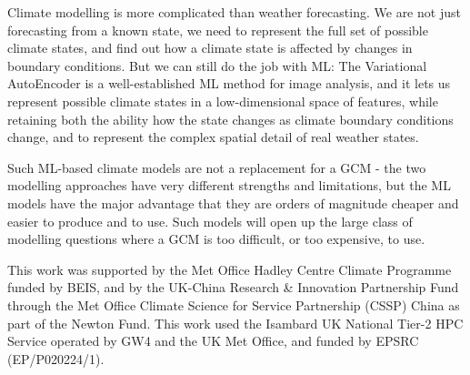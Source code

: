 \documentclass[gmd,manuscript]{copernicus}
\begin{document}
Climate modelling is more complicated than weather forecasting. We are not just forecasting from a known state, we need to represent the full set of possible climate states, and find out how a climate state is affected by changes in boundary conditions. But we can still do the job with ML: The Variational AutoEncoder is a well-established ML method for image analysis, and it lets us represent possible climate states in a low-dimensional space of features, while retaining both the ability how the state changes as climate boundary conditions change, and to represent the complex spatial detail of real weather states.

Such ML-based climate models are not a replacement for a GCM - the two modelling approaches have very different strengths and limitations, but the ML models have the major advantage that they are orders of magnitude cheaper and easier to produce and to use. Such models will open up the large class of modelling questions where a GCM is too difficult, or too expensive, to use.









\begin{acknowledgements}
This work was supported by the Met Office Hadley Centre Climate Programme funded by BEIS, and by the UK-China Research \& Innovation Partnership Fund through the Met Office Climate Science for Service Partnership (CSSP) China as part of the Newton Fund.
This work used the Isambard UK National Tier-2 HPC Service operated by GW4 and the UK Met Office, and funded by EPSRC (EP/P020224/1).
\end{acknowledgements}





\end{document}
